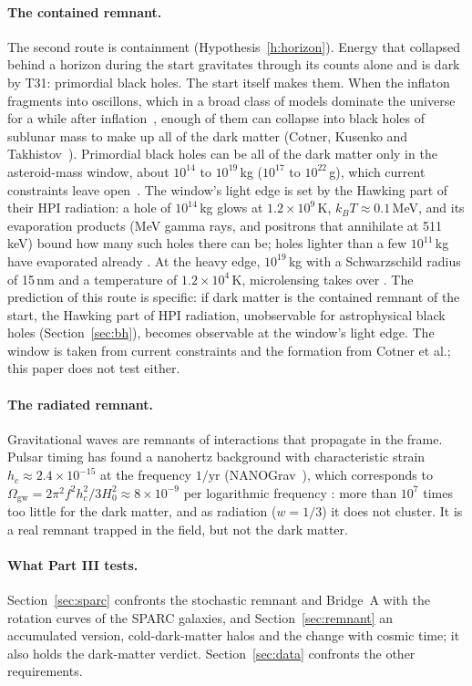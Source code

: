 \paragraph{The contained remnant.} The second route is containment (Hypothesis~\ref{h:horizon}). Energy that collapsed behind a horizon
during the start gravitates through its counts alone and is dark by T31: primordial black holes. The start itself makes them. When the
inflaton fragments into oscillons, which in a broad class of models dominate the universe for a while after inflation~\cite{amin}, enough
of them can collapse into black holes of sublunar mass to make up all of the dark matter (Cotner, Kusenko and Takhistov~\cite{cotner}).
Primordial black holes can be all of the dark matter only in the asteroid-mass window, about $10^{14}$ to $10^{19}$\,kg ($10^{17}$ to
$10^{22}$\,g), which current constraints leave open~\cite{gortongreen}. The window's light edge is set by the Hawking part of their HPI
radiation: a hole of $10^{14}$\,kg glows at $1.2\times10^9$\,K, $k_BT\approx0.1$\,MeV, and its evaporation products (MeV gamma rays, and
positrons that annihilate at 511\,keV) bound how many such holes there can be; holes lighter than a few $10^{11}$\,kg have evaporated
already . At the heavy edge, $10^{19}$\,kg with a Schwarzschild radius of 15\,nm and a temperature of $1.2\times10^4$\,K,
microlensing takes over . The prediction of this route is specific: if dark matter is the contained remnant of the start, the
Hawking part of HPI radiation, unobservable for astrophysical black holes (Section~\ref{sec:bh}), becomes observable at the window's light
edge. The window is taken from current constraints and the formation from Cotner et al.; this paper does not test either.

\paragraph{The radiated remnant.} Gravitational waves are remnants of interactions that propagate in the frame. Pulsar timing has found a
nanohertz background with characteristic strain $h_c\approx2.4\times10^{-15}$ at the frequency $1/\text{yr}$ (NANOGrav~\cite{nanograv}),
which corresponds to $\Omega_{\text{gw}}=2\pi^2f^2h_c^2/3H_0^2\approx8\times10^{-9}$ per logarithmic frequency : more than $10^7$
times too little for the dark matter, and as radiation ($w=1/3$) it does not cluster. It is a real remnant trapped in the field, but not
the dark matter.

\paragraph{What Part III tests.} Section~\ref{sec:sparc} confronts the stochastic remnant and Bridge~A with the rotation curves of the
SPARC galaxies, and Section~\ref{sec:remnant} an accumulated version, cold-dark-matter halos and the change with cosmic time; it also
holds the dark-matter verdict. Section~\ref{sec:data} confronts the other requirements.


